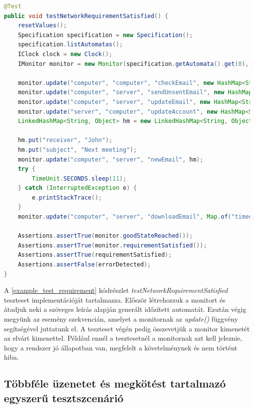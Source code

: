 \begin{lstlisting}[language=java, frame=single, float=ht!, caption={\textit{testNetworkRequirementSatisfied} teszteset.},captionpos=b,label=example_test_requirement]
@Test
public void testNetworkRequirementSatisfied() {
    resetValues();
    Specification specification = new Specification();
    specification.listAutomatas();
    IClock clock = new Clock();
    IMonitor monitor = new Monitor(specification.getAutomata().get(0), clock, this);
    
    monitor.update("computer", "computer", "checkEmail", new HashMap<String, Object>());
    monitor.update("computer", "server", "sendUnsentEmail", new HashMap<String, Object>());
    monitor.update("computer", "server", "updateEmail", new HashMap<String, Object>());
    monitor.update("server", "computer", "updateAccount", new HashMap<String, Object>());
    LinkedHashMap<String, Object> hm = new LinkedHashMap<String, Object>();

    hm.put("receiver", "John");
    hm.put("subject", "Next meeting");
    monitor.update("computer", "server", "newEmail", hm);
    try {
        TimeUnit.SECONDS.sleep(11);
    } catch (InterruptedException e) {
        e.printStackTrace();
    }
    monitor.update("computer", "server", "downloadEmail", Map.of("timeout", 10));
    
    Assertions.assertTrue(monitor.goodStateReached());
    Assertions.assertTrue(monitor.requirementSatisfied());
    Assertions.assertTrue(requirementSatisfied);
    Assertions.assertFalse(errorDetected);
}
\end{lstlisting}

A \ref{example_test_requirement} kódrészlet \textit{testNetworkRequirementSatisfied} teszteset implementációját tartalmazza.
Először létrehozzuk a monitort és átadjuk neki a szöveges leírás alapján generált időzített automatát.
Ezután végig megyünk az esemény szekvencián, amelyet a monitornak az \textit{update()} függvény segítségével juttatunk el.
A teszteset végén pedig összevetjük a monitor kimenetét az elvárt kimenettel.
Például ennél a tesztesetnél a monitornak azt kell jeleznie, hogy a rendszer jó állapotban van, megfelelt a követelménynek és nem történt hiba.

\clearpage\subsection{Többféle üzenetet és megkötést tartalmazó egyszerű tesztszcenárió}

